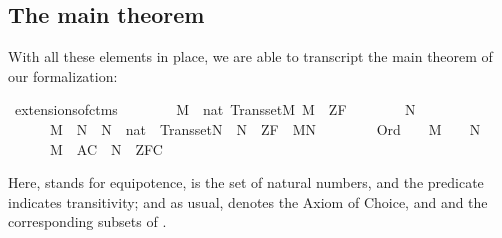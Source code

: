 \subsection{The main theorem}
With all these elements in place, we are able to transcript the main
theorem of our formalization:
\begin{isabelle}
\isamarkupfalse%
\ extensions{\isacharunderscore}of{\isacharunderscore}ctms{\isacharcolon}\isanewline
\ \ \ \isanewline
\ \ \ \ {\isachardoublequoteopen}M\ {\isasymapprox}\ nat{\isachardoublequoteclose}\ {\isachardoublequoteopen}Transset{\isacharparenleft}M{\isacharparenright}{\isachardoublequoteclose}\ {\isachardoublequoteopen}M\ {\isasymTurnstile}\ ZF{\isachardoublequoteclose}\isanewline
\ \ \ \isanewline
\ \ \ \ {\isachardoublequoteopen}{\isasymexists}N{\isachardot}\ \isanewline
\ \ \ \ \ \ M\ {\isasymsubseteq}\ N\ {\isasymand}\ N\ {\isasymapprox}\ nat\ {\isasymand}\ Transset{\isacharparenleft}N{\isacharparenright}\ {\isasymand}\ N\ {\isasymTurnstile}\ ZF\ {\isasymand}\ M{\isasymnoteq}N\ {\isasymand}\isanewline
\ \ \ \ \ \ {\isacharparenleft}{\isasymforall}{\isasymalpha}{\isachardot}\ Ord{\isacharparenleft}{\isasymalpha}{\isacharparenright}\ {\isasymlongrightarrow}\ {\isacharparenleft}{\isasymalpha}\ {\isasymin}\ M\ {\isasymlongleftrightarrow}\ {\isasymalpha}\ {\isasymin}\ N{\isacharparenright}{\isacharparenright}\ {\isasymand}\isanewline
\ \ \ \ \ \ {\isacharparenleft}M{\isacharcomma}\ {\isacharbrackleft}{\isacharbrackright}{\isasymTurnstile}\ AC\ {\isasymlongrightarrow}\ N\ {\isasymTurnstile}\ ZFC{\isacharparenright}{\isachardoublequoteclose}
\end{isabelle}
Here, \isatt{\isasymapprox} stands for equipotence,  is the
set of natural numbers, and the predicate 
 indicates transitivity; and as usual, 
denotes the Axiom of Choice, and  and  the
corresponding subsets of .


